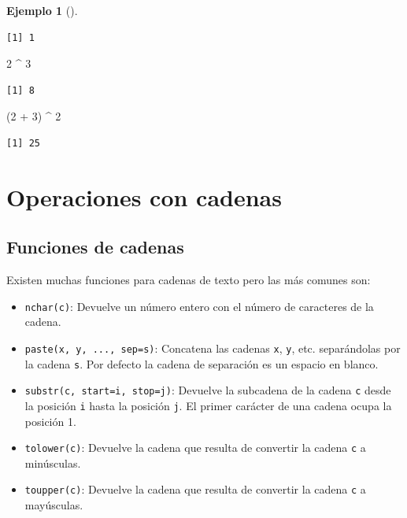 \documentclass[
  a4paper,
]{scrreport}
\newenvironment{Shaded}{\begin{snugshade}}{\end{snugshade}}
\newcommand{\DecValTok}[1]{\textcolor[rgb]{0.68,0.00,0.00}{#1}}
\newcommand{\NormalTok}[1]{\textcolor[rgb]{0.00,0.23,0.31}{#1}}
\newcommand{\SpecialCharTok}[1]{\textcolor[rgb]{0.37,0.37,0.37}{#1}}
\providecommand{\tightlist}{%
  \setlength{\itemsep}{0pt}\setlength{\parskip}{0pt}}\usepackage{longtable,booktabs,array}
\theoremstyle{definition}
\theoremstyle{definition}
\newtheorem{example}{Ejemplo}[chapter]
\theoremstyle{remark}
\begin{document}
\begin{example}[]
\begin{verbatim}
[1] 1
\end{verbatim}

\begin{Shaded}
\begin{Highlighting}[]
\DecValTok{2} \SpecialCharTok{\^{}} \DecValTok{3}
\end{Highlighting}
\end{Shaded}

\begin{verbatim}
[1] 8
\end{verbatim}

\begin{Shaded}
\begin{Highlighting}[]
\NormalTok{(}\DecValTok{2} \SpecialCharTok{+} \DecValTok{3}\NormalTok{) }\SpecialCharTok{\^{}} \DecValTok{2}
\end{Highlighting}
\end{Shaded}

\begin{verbatim}
[1] 25
\end{verbatim}

\end{example}

\hypertarget{operaciones-con-cadenas}{%
\section{Operaciones con cadenas}\label{operaciones-con-cadenas}}

\hypertarget{funciones-de-cadenas}{%
\subsection{Funciones de cadenas}\label{funciones-de-cadenas}}

Existen muchas funciones para cadenas de texto pero las más comunes son:

\begin{itemize}
\tightlist
\item
  \texttt{nchar(c)}: Devuelve un número entero con el número de
  caracteres de la cadena.
\item
  \texttt{paste(x,\ y,\ ...,\ sep=s)}: Concatena las cadenas \texttt{x},
  \texttt{y}, etc. separándolas por la cadena \texttt{s}. Por defecto la
  cadena de separación es un espacio en blanco.
\item
  \texttt{substr(c,\ start=i,\ stop=j)}: Devuelve la subcadena de la
  cadena \texttt{c} desde la posición \texttt{i} hasta la posición
  \texttt{j}. El primer carácter de una cadena ocupa la posición 1.
\item
  \texttt{tolower(c)}: Devuelve la cadena que resulta de convertir la
  cadena \texttt{c} a minúsculas.
\item
  \texttt{toupper(c)}: Devuelve la cadena que resulta de convertir la
  cadena \texttt{c} a mayúsculas.
\end{itemize}
\end{document}
